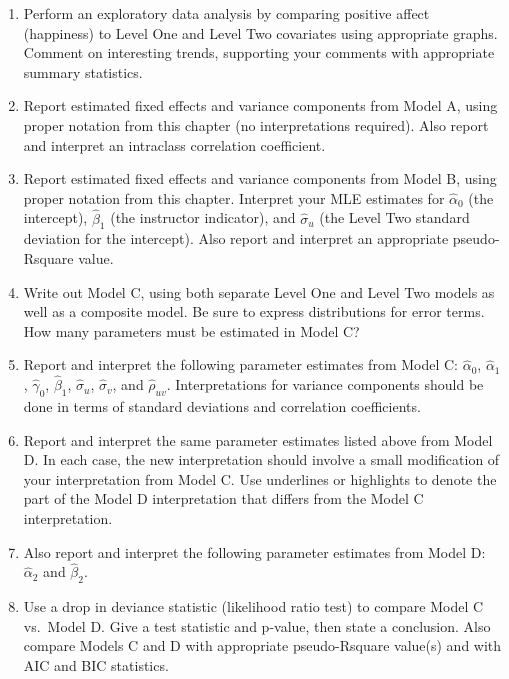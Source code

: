 \documentclass[
]{krantz}
\providecommand{\tightlist}{%
  \setlength{\itemsep}{0pt}\setlength{\parskip}{0pt}}
\begin{document}
\begin{enumerate}
  \begin{enumerate}
  \def\labelenumii{\arabic{enumii}.}
  \tightlist
  \item
    Perform an exploratory data analysis by comparing positive affect (happiness) to Level One and Level Two covariates using appropriate graphs. Comment on interesting trends, supporting your comments with appropriate summary statistics.
  \item
    Report estimated fixed effects and variance components from Model A, using proper notation from this chapter (no interpretations required). Also report and interpret an intraclass correlation coefficient.
  \item
    Report estimated fixed effects and variance components from Model B, using proper notation from this chapter. Interpret your MLE estimates for \(\hat{\alpha}_{0}\) (the intercept), \(\hat{\beta}_{1}\) (the instructor indicator), and \(\hat{\sigma}_{u}\) (the Level Two standard deviation for the intercept). Also report and interpret an appropriate pseudo-Rsquare value.
  \item
    Write out Model C, using both separate Level One and Level Two models as well as a composite model. Be sure to express distributions for error terms. How many parameters must be estimated in Model C?
  \item
    Report and interpret the following parameter estimates from Model C: \(\hat{\alpha}_{0}\), \(\hat{\alpha}_{1}\), \(\hat{\gamma}_{0}\), \(\hat{\beta}_{1}\), \(\hat{\sigma}_{u}\), \(\hat{\sigma}_{v}\), and \(\hat{\rho}_{uv}\). Interpretations for variance components should be done in terms of standard deviations and correlation coefficients.
  \item
    Report and interpret the same parameter estimates listed above from Model D. In each case, the new interpretation should involve a small modification of your interpretation from Model C. Use underlines or highlights to denote the part of the Model D interpretation that differs from the Model C interpretation.
  \item
    Also report and interpret the following parameter estimates from Model D: \(\hat{\alpha}_{2}\) and \(\hat{\beta}_{2}\).
  \item
    Use a drop in deviance statistic (likelihood ratio test) to compare Model C vs.~Model D. Give a test statistic and p-value, then state a conclusion. Also compare Models C and D with appropriate pseudo-Rsquare value(s) and with AIC and BIC statistics.
  \end{enumerate}
\end{enumerate}
\end{document}
